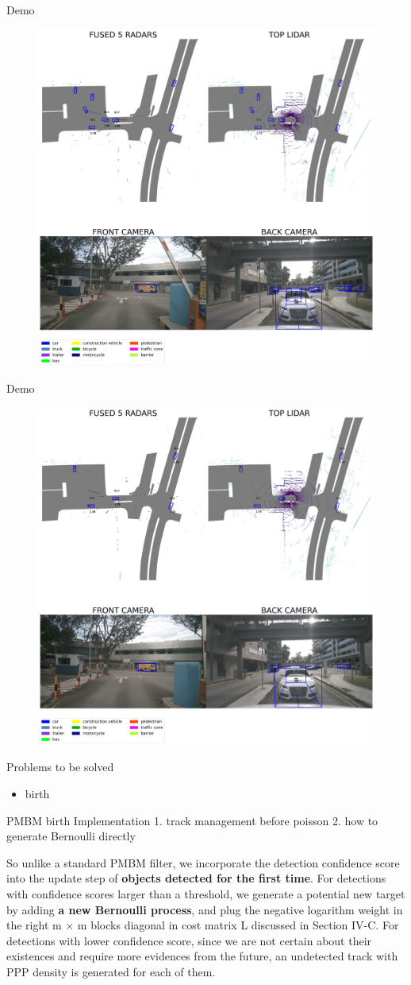 \documentclass[aspectratio=169,xcolor=dvipsnames]{beamer}
\begin{document}
\begin{frame}{Demo}
    \begin{figure}
        \includegraphics[width=0.4\linewidth]{demo/26.png}
    \end{figure}
\end{frame}
\begin{frame}{Demo}
    \begin{figure}
        \includegraphics[width=0.4\linewidth]{demo/27.png}
    \end{figure}
\end{frame}

\begin{frame}{Problems to be solved}
    \begin{itemize}
        \item{birth}
    \end{itemize}
\end{frame}

\begin{frame}{PMBM birth Implementation}
    1. track management before poisson
    2. how to generate Bernoulli directly
    \begin{block}{}
    So unlike a standard PMBM filter, we incorporate the detection confidence score into the update step 
    of \textbf{objects detected for the first time}. 
    For detections with confidence scores larger than a threshold, 
    we generate a potential new target by adding \textbf{a new Bernoulli process}, 
    and plug the negative logarithm weight in the right m × m blocks diagonal in cost matrix L 
    discussed in Section IV-C. For detections with lower confidence score, 
    since we are not certain about their existences and require more evidences from the future, 
    an undetected track with PPP density is generated for each of them.
    \href{https://www.researchgate.net/publication/355428771_3D_Multi-Object_Tracking_using_Random_Finite_Set-based_Multiple_Measurement_Models_Filtering_RFS-M_3_for_Autonomous_Vehicles}{}
    \end{block}
\end{frame}
\end{document}
